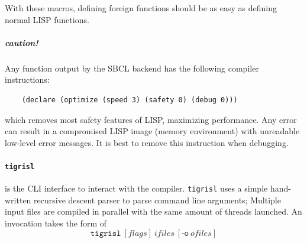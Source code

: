 \documentclass[a4paper, 11pt]{article}
\theoremstyle{remark}\newtheorem*{remark}{Remark}
\theoremstyle{definition}\newtheorem*{definition}{Definition}
\begin{document}
With these macros, defining foreign functions should be as easy as defining normal LISP functions.

\subparagraph*{caution!} Any function output by the SBCL backend has the following compiler instructions:
  \begin{verbatim}
    (declare (optimize (speed 3) (safety 0) (debug 0)))
  \end{verbatim}
which removes most safety features of LISP, maximizing performance.
Any error can result in a compromised LISP image (memory environment) with
unreadable low-level error messages. It is best to remove this instruction when debugging.

\paragraph{\texttt{tigrisl}} is the CLI interface to interact with the compiler.
\texttt{tigrisl} uses a simple hand-written recursive descent parser to parse command line arguments;
Multiple input files are compiled in parallel with the same amount of threads launched.
An invocation takes the form of
\[
\texttt{tigrisl}\ [\textit{flags}]\ \textit{ifiles}\ [\textsf{-o}\ \textit{ofiles}]
\]
\end{document}
